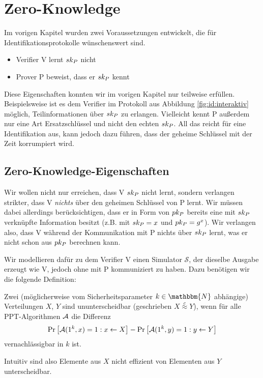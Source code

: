 \chapter{Zero-Knowledge}

Im vorigen Kapitel wurden zwei Voraussetzungen entwickelt, die für Identifikationsprotokolle wünschenswert sind.
\begin{itemize}
  \item Verifier V lernt $sk_P$ nicht
  \item Prover P beweist, dass er $sk_P$ kennt
\end{itemize}
Diese Eigenschaften konnten wir im vorigen Kapitel nur teilweise erfüllen. Beispielsweise ist es dem Verifier im Protokoll aus Abbildung
\ref{fig:id:interaktiv} möglich, Teilinformationen über $sk_P$ zu erlangen. Vielleicht kennt P außerdem nur eine Art Ersatzschlüssel und nicht den echten
$sk_P$. All das reicht für eine Identifikation aus, kann jedoch dazu führen, dass der geheime Schlüssel mit der Zeit korrumpiert wird.

\section{Zero-Knowledge-Eigenschaften}
Wir wollen nicht nur erreichen, dass V $sk_P$ nicht lernt, sondern verlangen strikter, dass V \emph{nichts} über den geheimen Schlüssel von
P lernt. Wir müssen dabei allerdings berücksichtigen, dass er in Form von $pk_P$ bereits eine mit $sk_P$ verknüpfte Information besitzt (z.B.
mit $sk_P = x$ und $pk_P = g^x$). Wir verlangen also, dass V während der Kommunikation mit P nichts über $sk_P$ lernt, was er nicht schon aus $pk_P$ berechnen kann.

Wir modellieren dafür zu dem Verifier V einen Simulator $\mathcal{S}$, der dieselbe Ausgabe erzeugt wie V, jedoch ohne mit P kommuniziert zu haben. Dazu benötigen wir die folgende Definition:
\begin{definition}[Ununterscheidbarkeit]
\label{def:zk:ununterscheidbarkeit}
Zwei (möglicherweise vom Sicherheitsparameter $k \in \mathbbm{N}$ abhängige) Verteilungen $X$, $Y$ sind ununterscheidbar (geschrieben $X
\stackrel{c}\approx Y$), wenn für alle PPT-Algorithmen $\mathcal{A}$ die Differenz
\begin{align*}
\Pr \left[ \mathcal{A}(1^k,x) = 1 : x \leftarrow X \right] - \Pr \left[ \mathcal{A}(1^k, y) = 1 : y \leftarrow Y \right]
\end{align*}
vernachlässigbar in $k$ ist.
\end{definition}
Intuitiv sind also Elemente aus $X$ nicht effizient von Elementen aus $Y$ unterscheidbar.

